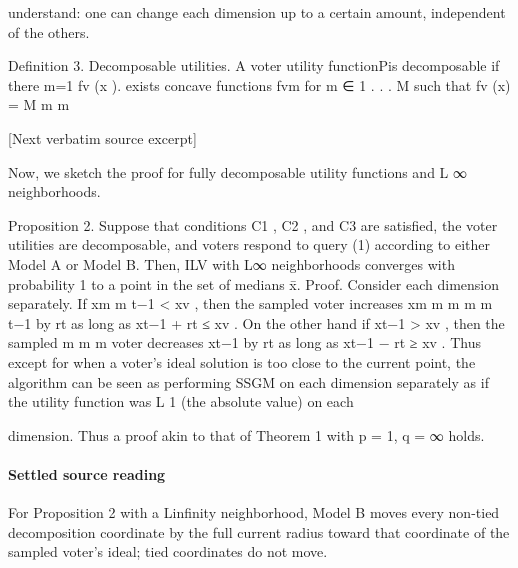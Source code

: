 \documentclass[10pt]{article}
\begin{document}
\begin{ReviewVerbatim}
understand: one can change each dimension up to a certain amount, independent of the
others.


Definition 3. Decomposable utilities. A voter utility functionPis decomposable if there
                                                                     m=1 fv (x ).
exists concave functions fvm for m ∈ {1 . . . M } such that fv (x) = M    m m



[Next verbatim source excerpt]

   Now, we sketch the proof for fully decomposable utility functions and L
                                                                                     ∞ neighborhoods.


Proposition 2. Suppose that conditions C1 , C2 , and C3 are satisfied, the voter utilities
are decomposable, and voters respond to query (1) according to either Model A or Model
B. Then, ILV with L∞ neighborhoods converges with probability 1 to a point in the set of
medians x̄.
Proof. Consider each dimension separately. If xm      m
                                               t−1 < xv , then the sampled voter increases
xm                     m            m                         m       m
 t−1 by rt as long as xt−1 + rt ≤ xv . On the other hand if xt−1 > xv , then the sampled
                 m                     m           m
voter decreases xt−1 by rt as long as xt−1 − rt ≥ xv . Thus except for when a voter's ideal
solution is too close to the current point, the algorithm can be seen as performing SSGM
on each dimension separately as if the utility function was L
                                                                         1 (the absolute value) on each

dimension. Thus a proof akin to that of Theorem 1 with p = 1, q = ∞ holds.
\end{ReviewVerbatim}

\paragraph{Settled source reading}
\begin{sloppypar}
For Proposition 2 with a Linfinity neighborhood, Model B moves every non-\allowbreak{}tied decomposition coordinate by the full current radius toward that coordinate of the sampled voter's ideal;\allowbreak{} tied coordinates do not move.\allowbreak{}
\end{sloppypar}
\end{document}

